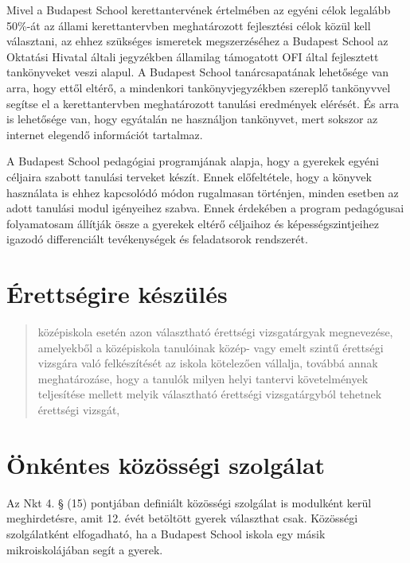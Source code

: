 Mivel a Budapest School kerettantervének értelmében az egyéni célok
legalább 50\%-át az állami kerettantervben meghatározott fejlesztési
célok közül kell választani, az ehhez szükséges ismeretek megszerzéséhez
a Budapest School az Oktatási Hivatal általi jegyzékben államilag
támogatott OFI által fejlesztett tankönyveket veszi alapul. A Budapest
School tanárcsapatának lehetősége van arra, hogy ettől eltérő, a
mindenkori tankönyvjegyzékben szereplő tankönyvvel segítse el a
kerettantervben meghatározott tanulási eredmények elérését. És arra is
lehetősége van, hogy egyátalán ne használjon tankönyvet, mert sokszor az
internet elegendő információt tartalmaz.

A Budapest School pedagógiai programjának alapja, hogy a gyerekek egyéni
céljaira szabott tanulási terveket készít. Ennek előfeltétele, hogy a
könyvek használata is ehhez kapcsolódó módon rugalmasan történjen,
minden esetben az adott tanulási modul igényeihez szabva. Ennek
érdekében a program pedagógusai folyamatosam állítják össze a gyerekek
eltérő céljaihoz és képességszintjeihez igazodó differenciált
tevékenységek és feladatsorok rendszerét.

\section{Érettségire készülés }

\begin{quote}
      középiskola esetén azon választható érettségi vizsgatárgyak megnevezése,
      amelyekből a középiskola tanulóinak közép- vagy emelt szintű érettségi
      vizsgára való felkészítését az iskola kötelezően vállalja, továbbá annak
      meghatározáse, hogy a tanulók milyen helyi tantervi követelmények
      teljesítése mellett melyik választható érettségi vizsgatárgyból tehetnek
      érettségi vizsgát,
\end{quote}




\section{Önkéntes közösségi
  szolgálat}\label{uxf6nkuxe9ntes-kuxf6zuxf6ssuxe9gi-szolguxe1lat}

Az Nkt 4. § (15) pontjában definiált közösségi szolgálat is modulként
kerül meghirdetésre, amit 12. évét betöltött gyerek választhat csak.
Közösségi szolgálatként elfogadható, ha a Budapest School iskola egy
másik mikroiskolájában segít a gyerek.
